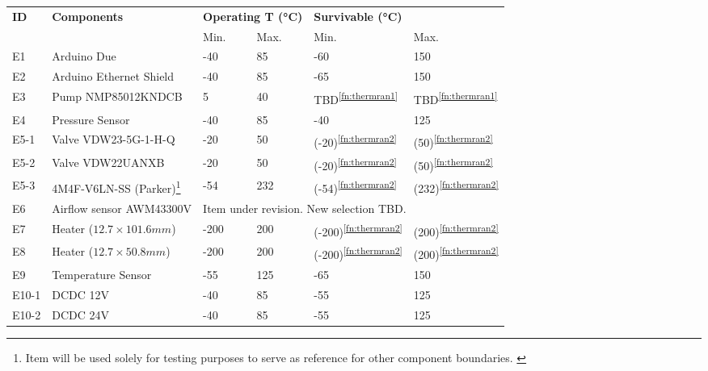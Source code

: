 



\begin{longtable}{|m{1cm}|m{3.5cm}|m{1.5cm}|m{1.5cm}|m{1.5cm}|m{1.5cm}|}
\hline
\multirow{2}{*}{\textbf{ID}} & \multirow{2}{*}{\textbf{Components}}                                 & \multicolumn{2}{l|}{\textbf{Operating T (°C)}} & \multicolumn{2}{l|}{\textbf{Survivable (°C)}} \\ \cline{3-6} &                                                                      & Min.                   & Max.                  & Min.                  & Max.                  \\ \hline
E1 & Arduino Due & -40 & 85 & -60 & 150 \\ \hline
E2 & Arduino Ethernet Shield & -40 & 85 & -65 & 150 \\ \hline
E3 & Pump NMP85012KNDCB & 5 & 40 & TBD\textsuperscript{\ref{fn:thermran1}} & TBD\textsuperscript{\ref{fn:thermran1}} \\ \hline
E4 & Pressure Sensor & -40 & 85 & -40 & 125 \\ \hline
E5-1 & Valve VDW23-5G-1-H-Q & -20 & 50 & (-20)\textsuperscript{\ref{fn:thermran2}} & (50)\textsuperscript{\ref{fn:thermran2}} \\ \hline
E5-2 & Valve VDW22UANXB & -20 & 50 & (-20)\textsuperscript{\ref{fn:thermran2}} & (50)\textsuperscript{\ref{fn:thermran2}} \\ \hline
E5-3 & 4M4F-V6LN-SS (Parker)\footnote{Item will be used solely for testing purposes to serve as reference for other component boundaries. \label{fn:thermran3}} & -54 & 232 & (-54)\textsuperscript{\ref{fn:thermran2}} & (232)\textsuperscript{\ref{fn:thermran2}} \\ \hline
E6 & Airflow sensor AWM43300V & \multicolumn{4}{l|}{Item under revision. New selection TBD.} \\ \hline
E7 & Heater ($12.7\times 101.6 mm$) & -200 & 200 & (-200)\textsuperscript{\ref{fn:thermran2}} & (200)\textsuperscript{\ref{fn:thermran2}} \\ \hline
E8 & Heater ($12.7\times 50.8 mm$) & -200 & 200 & (-200)\textsuperscript{\ref{fn:thermran2}} & (200)\textsuperscript{\ref{fn:thermran2}} \\ \hline
E9 & Temperature Sensor & -55 & 125 & -65 & 150 \\ \hline
E10-1 & DCDC 12V & -40 & 85 & -55 & 125 \\ \hline
E10-2 & DCDC 24V & -40 & 85 & -55 & 125 \\ \hline

\end{longtable}
